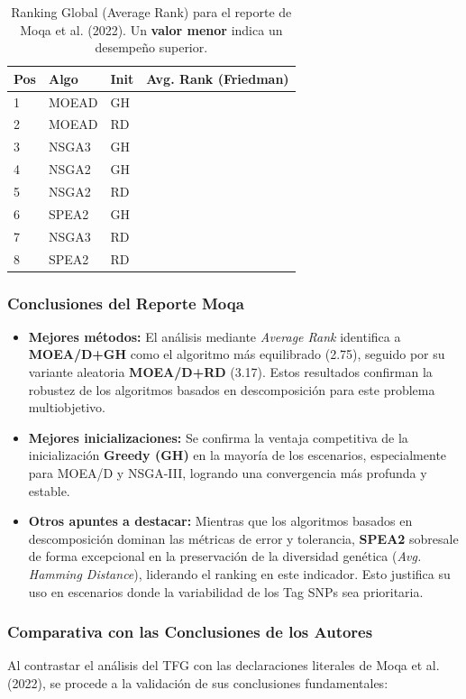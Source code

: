 \documentclass[a4paper,10pt]{article}
\begin{document}
\begin{table}[H]
    \centering
    \begin{tabular}{lllc}
        \toprule
        Pos & Algo & Init & Avg. Rank (Friedman) \\
        \midrule
        1 & MOEAD & GH \\
        2 & MOEAD & RD \\
        3 & NSGA3 & GH \\
        4 & NSGA2 & GH \\
        5 & NSGA2 & RD \\
        6 & SPEA2 & GH \\
        7 & NSGA3 & RD \\
        8 & SPEA2 & RD \\
        \bottomrule
    \end{tabular}
    \caption{Ranking Global (Average Rank) para el reporte de Moqa et al. (2022). Un \textbf{valor menor} indica un desempeño superior.}
\end{table}

\subsubsection{Conclusiones del Reporte Moqa}
 \begin{itemize}
     \item \textbf{Mejores métodos:} El análisis mediante \textit{Average Rank} identifica a \textbf{MOEA/D+GH} como el algoritmo más equilibrado (2.75), seguido por su variante aleatoria \textbf{MOEA/D+RD} (3.17). Estos resultados confirman la robustez de los algoritmos basados en descomposición para este problema multiobjetivo.
     \item \textbf{Mejores inicializaciones:} Se confirma la ventaja competitiva de la inicialización \textbf{Greedy (GH)} en la mayoría de los escenarios, especialmente para MOEA/D y NSGA-III, logrando una convergencia más profunda y estable.
     \item \textbf{Otros apuntes a destacar:} Mientras que los algoritmos basados en descomposición dominan las métricas de error y tolerancia, \textbf{SPEA2} sobresale de forma excepcional en la preservación de la diversidad genética (\textit{Avg. Hamming Distance}), liderando el ranking en este indicador. Esto justifica su uso en escenarios donde la variabilidad de los Tag SNPs sea prioritaria.
 \end{itemize}

\subsubsection{Comparativa con las Conclusiones de los Autores}
Al contrastar el análisis del TFG con las declaraciones literales de Moqa et al. (2022), se procede a la validación de sus conclusiones fundamentales:
\end{document}
